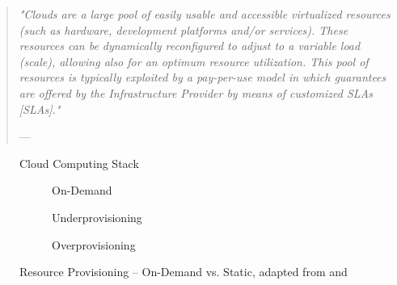 \begin{quote}{\slshape 
"Clouds are a large pool of easily usable and accessible virtualized resources (such as hardware, development platforms and/or services). These resources can be dynamically reconfigured to adjust to a variable load (scale), allowing also for an optimum resource utilization. This
pool of resources is typically exploited by a pay-per-use model in which guarantees are offered by the Infrastructure Provider by means of customized \acs{SLA}s [\acl{SLA}s]."}
\vspace*{-5pt}
\begin{flushright}
	--- \citet[p. 51]{Vaquero2009}
\end{flushright}
\end{quote}


\begin{figure}[htb]
	\centering
	
	\caption{Cloud Computing Stack}
	\label{fig:ccs}
\end{figure}

\begin{figure}[htb]
	\centering
	\begin{subfigure}{.75\textwidth}
		\centering
		
		\caption{On-Demand}\label{fig:rpc}
	\end{subfigure}
	\begin{subfigure}[b]{.75\textwidth}
		\centering
		
		\caption{Underprovisioning}\label{fig:rpu}
	\end{subfigure}
	\begin{subfigure}[b]{.75\textwidth}
		\centering
		
		\caption{Overprovisioning}\label{fig:rpo}
	\end{subfigure}
	\caption[Resource Provisioning -- On-Demand vs. Static]{Resource Provisioning -- On-Demand vs. Static, adapted from \citet[p. 54]{Armbrust2010} and \citet[p. 127]{Iyer2010}}
	\label{fig:rp}
\end{figure}
